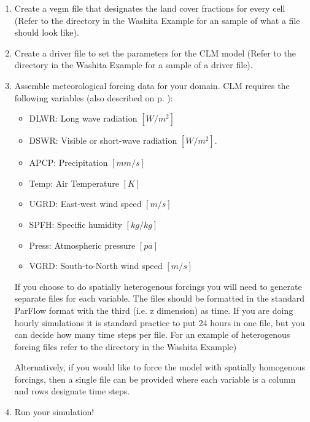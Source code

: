 \begin{enumerate}
   \item Create a  vegm file that designates the land cover fractions for every 
   cell (Refer to the  directory in the Washita Example for an sample of 
   what a  file should look like).

   \item Create a  driver file to set the parameters for the CLM model (Refer to the 
    directory in the Washita Example for a sample of a  driver file).

   \item Assemble meteorological forcing data for your domain. CLM requires the following 
   variables (also described on p. \pageref{clm_forcing}): 
   
   \begin{itemize}
		\item DLWR: Long wave radiation $[W/m^2]$
		\item DSWR: Visible or short-wave radiation $[W/m^2]$.
		\item APCP: Precipitation $[mm/s]$
		\item Temp: Air Temperature $[K]$
		\item UGRD: East-west wind speed $[m/s]$
		\item SPFH:	Specific humidity $[kg/kg]$
		\item Press: Atmospheric pressure $[pa]$
                \item VGRD: South-to-North wind speed $[m/s]$
	\end{itemize}
	
	If you choose to do spatially heterogenous forcings you will need to generate separate 
	files for each variable. The files should be formatted in the standard ParFlow format 
	with the third (i.e. z dimension) as time. If you are doing hourly simulations it is 
	standard practice to put 24 hours in one file, but you can decide how many time steps per 
	file. For an example of heterogenous forcing files refer to the  directory
	in the Washita Example)

	Alternatively, if you would like to force the model with spatially homogenous forcings, 
	then a single file can be provided where each variable is a column and rows designate 
	time steps. 

   \item Run your simulation!
   
\end{enumerate}

